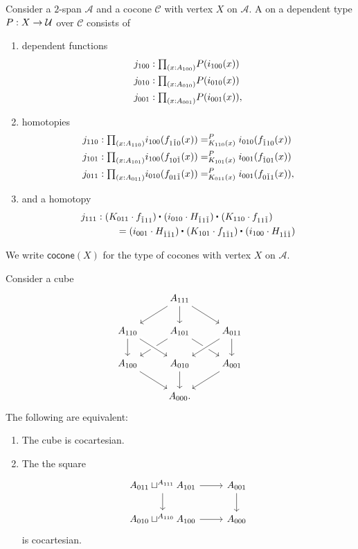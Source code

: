 \begin{defn}
Consider a $2$-span $\mathcal{A}$ and a cocone $\mathcal{C}$ with vertex $X$ on $\mathcal{A}$. A  on a dependent type $P:X\to\mathcal{U}$ over $\mathcal{C}$ consists of
\begin{enumerate}
\item dependent functions
\begin{align*}
j_{100} & : \prd{x:A_{100}}P(i_{100}(x))\\
j_{010} & : \prd{x:A_{010}}P(i_{010}(x))\\
j_{001} & : \prd{x:A_{001}}P(i_{001}(x)),
\end{align*}
\item homotopies
\begin{align*}
j_{110} & : \prd{x:A_{110}} \dpath{P}{K_{110}(x)}{i_{100}(f_{1\check{1}0}(x))}{i_{010}(f_{\check{1}10}(x))} \\
j_{101} & : \prd{x:A_{101}} \dpath{P}{K_{101}(x)}{i_{100}(f_{10\check{1}}(x))}{i_{001}(f_{\check{1}01}(x))} \\
j_{011} & : \prd{x:A_{011}} \dpath{P}{K_{011}(x)}{i_{010}(f_{01\check{1}}(x))}{i_{001}(f_{0\check{1}1}(x))},
\end{align*}
\item and a homotopy
\begin{align*}
j_{111} & : \ct{(K_{011}\cdot f_{\check{1}11})}{(i_{010}\cdot H_{\check{1}1\check{1}})}{(K_{110}\cdot f_{11\check{1}})} \\
& \qquad = \ct{(i_{001}\cdot H_{\check{1}\check{1}1})}{(K_{101}\cdot f_{1\check{1}1})}{(i_{100}\cdot H_{1\check{1}\check{1}})}
\end{align*}
\end{enumerate}
We write $\mathsf{cocone}(X)$ for the type of cocones with vertex $X$ on $\mathcal{A}$.
\end{defn}

\begin{thm}
Consider a cube
\begin{equation*}
\begin{tikzcd}
& A_{111} \arrow[dl] \arrow[d] \arrow[dr] \\
A_{110} \arrow[d] & A_{101} \arrow[dl] \arrow[dr] & A_{011} \arrow[d] \\
A_{100} \arrow[dr] & A_{010} \arrow[d] \arrow[from=ul,crossing over] \arrow[from=ur,crossing over] & A_{001} \arrow[dl] \\
& A_{000}.
\end{tikzcd}
\end{equation*}
The following are equivalent:
\begin{enumerate}
\item The cube is cocartesian.
\item The the square
\begin{equation*}
\begin{tikzcd}
A_{011}\sqcup^{A_{111}} A_{101} \arrow[r] \arrow[d] & A_{001} \arrow[d] \\
A_{010}\sqcup^{A_{110}} A_{100} \arrow[r] & A_{000}
\end{tikzcd}
\end{equation*}
is cocartesian.
\end{enumerate}
\end{thm}

